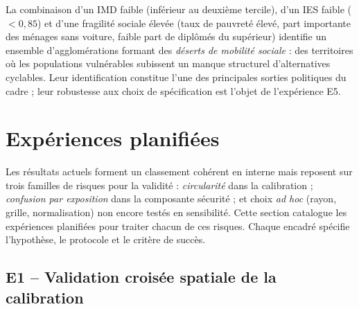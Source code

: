 \documentclass[11pt,a4paper]{article}
\begin{document}
La combinaison d'un IMD faible (inférieur au deuxième tercile),
d'un IES faible ($< 0{,}85$) et d'une fragilité sociale élevée
(taux de pauvreté élevé, part importante des ménages sans
voiture, faible part de diplômés du supérieur) identifie un
ensemble d'agglomérations formant des \emph{déserts de mobilité
sociale} : des territoires où les populations vulnérables
subissent un manque structurel d'alternatives cyclables. Leur
identification constitue l'une des principales sorties politiques
du cadre ; leur robustesse aux choix de spécification est l'objet
de l'expérience E5.

\section{Expériences planifiées}
\label{sec:experiments}

Les résultats actuels forment un classement cohérent en interne
mais reposent sur trois familles de risques pour la validité :
\emph{circularité} dans la calibration ; \emph{confusion par
exposition} dans la composante sécurité ; et choix \emph{ad hoc}
(rayon, grille, normalisation) non encore testés en sensibilité.
Cette section catalogue les expériences planifiées pour traiter
chacun de ces risques. Chaque encadré spécifie l'hypothèse, le
protocole et le critère de succès.

\subsection{E1 -- Validation croisée spatiale de la calibration}
\label{sec:exp-cv}
\end{document}
